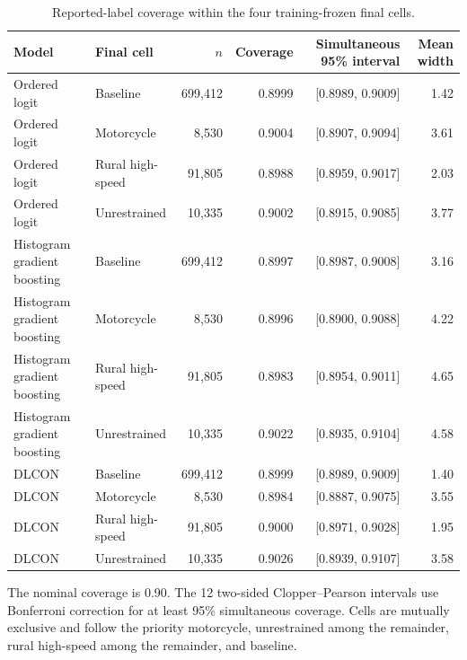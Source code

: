 \begin{table}[pos=htbp]
\caption{Reported-label coverage within the four training-frozen final cells.}
\label{tab:maincells}
\centering\footnotesize
\begin{threeparttable}
\begin{tabular}{llrrrr}
\toprule
Model & Final cell & $n$ & Coverage & Simultaneous 95\% interval & Mean width \\
\midrule
Ordered logit & Baseline & 699,412 & 0.8999 & [0.8989, 0.9009] & 1.42 \\
Ordered logit & Motorcycle & 8,530 & 0.9004 & [0.8907, 0.9094] & 3.61 \\
Ordered logit & Rural high-speed & 91,805 & 0.8988 & [0.8959, 0.9017] & 2.03 \\
Ordered logit & Unrestrained & 10,335 & 0.9002 & [0.8915, 0.9085] & 3.77 \\
\addlinespace
Histogram gradient boosting & Baseline & 699,412 & 0.8997 & [0.8987, 0.9008] & 3.16 \\
Histogram gradient boosting & Motorcycle & 8,530 & 0.8996 & [0.8900, 0.9088] & 4.22 \\
Histogram gradient boosting & Rural high-speed & 91,805 & 0.8983 & [0.8954, 0.9011] & 4.65 \\
Histogram gradient boosting & Unrestrained & 10,335 & 0.9022 & [0.8935, 0.9104] & 4.58 \\
\addlinespace
DLCON & Baseline & 699,412 & 0.8999 & [0.8989, 0.9009] & 1.40 \\
DLCON & Motorcycle & 8,530 & 0.8984 & [0.8887, 0.9075] & 3.55 \\
DLCON & Rural high-speed & 91,805 & 0.9000 & [0.8971, 0.9028] & 1.95 \\
DLCON & Unrestrained & 10,335 & 0.9026 & [0.8939, 0.9107] & 3.58 \\
\bottomrule
\end{tabular}
\begin{tablenotes}\footnotesize
\item The nominal coverage is 0.90. The 12 two-sided Clopper--Pearson intervals use Bonferroni correction for at least 95\% simultaneous coverage. Cells are mutually exclusive and follow the priority motorcycle, unrestrained among the remainder, rural high-speed among the remainder, and baseline.
\end{tablenotes}
\end{threeparttable}
\end{table}
